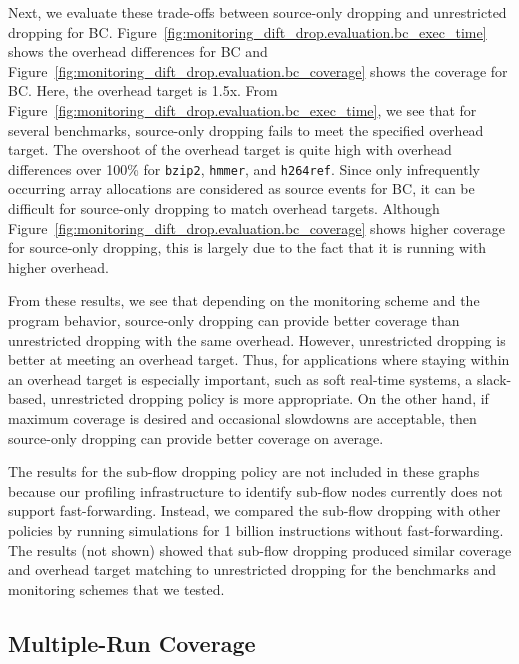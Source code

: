Next, we evaluate these trade-offs between source-only dropping and
unrestricted dropping for BC.
Figure~\ref{fig:monitoring_dift_drop.evaluation.bc_exec_time} shows the
overhead differences for BC and
Figure~\ref{fig:monitoring_dift_drop.evaluation.bc_coverage} shows the coverage
for BC.  Here, the overhead target is 1.5x.  From
Figure~\ref{fig:monitoring_dift_drop.evaluation.bc_exec_time}, we see that for
several benchmarks, source-only dropping fails to meet the specified overhead
target.  The overshoot of the overhead target is quite high with overhead
differences over 100\% for {\tt bzip2}, {\tt hmmer}, and {\tt h264ref}.  Since
only infrequently occurring array allocations are considered as source events
for BC, it can be difficult for source-only dropping to match overhead targets.
Although Figure~\ref{fig:monitoring_dift_drop.evaluation.bc_coverage} shows
higher coverage for source-only dropping, this is largely due to the fact that
it is running with higher overhead.

From these results, we see that depending on the monitoring scheme and the program
behavior, source-only dropping can provide better coverage than unrestricted
dropping with the same overhead. However, unrestricted dropping is better at
meeting an overhead target.  Thus, for applications where staying within an
overhead target is especially important, such as soft real-time systems, a
slack-based, unrestricted dropping policy is more appropriate. On the other
hand, if maximum coverage is desired and occasional slowdowns are acceptable,
then source-only dropping can provide better coverage on average.

The results for the sub-flow dropping policy are not included in these graphs
because our profiling infrastructure to identify sub-flow nodes currently does
not support fast-forwarding. Instead, we compared the sub-flow dropping with
other policies by running simulations for 1 billion instructions without
fast-forwarding. The results (not shown) showed that sub-flow dropping produced
similar coverage and overhead target matching to unrestricted dropping for the
benchmarks and monitoring schemes that we tested.

\subsection{Multiple-Run Coverage}

